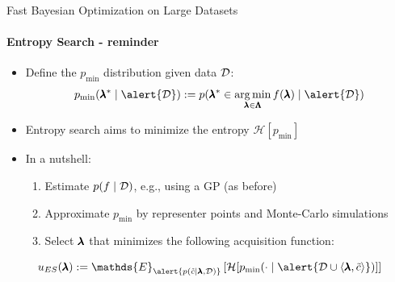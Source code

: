 \begin{frame}[c]{Fast Bayesian Optimization on Large Datasets}
\framesubtitle{Entropy Search - reminder}

\begin{itemize}
		\item Define the $p_{\text{min}}$ distribution given data $\mathcal{D}$:
		$$p_{\text{min}}(\conf^* \mid \alert{\dataset}) := p(\conf^* \in \argmin_{\conf\in \pcs} \func(\conf) \mid \alert{\dataset})$$
	
		\item Entropy search aims to minimize the entropy \alert{$\mathcal{H}[p_\text{min}]$} 
		\item In a nutshell:
		\begin{enumerate}
			\item Estimate $p(f \mid \mathcal{D})$, e.g., using a GP (as before)
			\item Approximate $p_\text{min}$ by representer points and Monte-Carlo simulations
			\item Select $\pmb{\lambda}$ that minimizes the following acquisition function:
		\end{enumerate}
\end{itemize}
\vspace*{0.5cm}
	\[{\acq}_{ES}(\conf) := \mathds{E}_{\alert{p(\tilde{\cost}\mid \conf, \dataset)}} 
	\left[   \mathcal{H}[p_{\text{min}}(\cdot \mid \alert{\dataset \cup \left\langle \conf, \tilde{\cost} \right\rangle })] \right]\]

\end{frame}

